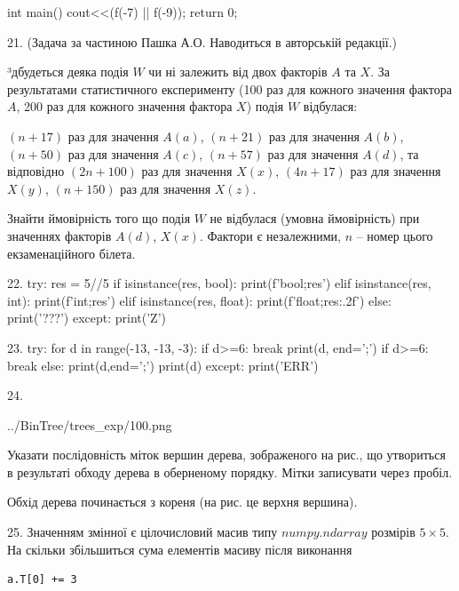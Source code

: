 \documentclass[11pt]{article}
\begin{document}
int main(){
    cout<<(f(-7) || f(-9));
    return 0;
}

21. 
(Задача за частиною Пашка А.О. Наводиться в авторській редакції.)\par {\hspace {0.5 cm}}³дбудеться деяка подія $W$ чи ні залежить від двох факторів $A$ та $X$. За результатами статистичного експерименту (100 раз для кожного значення фактора $A$,  200 раз для кожного значення фактора $X$) подія $W$ відбулася:\par {\hspace {0.5 cm}}$(n+17)$ раз для значення $A(a)$, $(n+21)$ раз для значення $A(b)$, $(n+50)$ раз для значення $A(c)$, $(n+57)$ раз для значення $A(d)$, та відповідно $(2n+100)$ раз для значення $X(x)$, $(4n+17)$ раз для значення $X(y)$, $(n+150)$ раз для значення $X(z)$.\par
{\hspace {0.5 cm}}Знайти ймовірність того що подія $W$ не відбулася (умовна ймовірність) при значеннях факторів $A(d)$, $X(x)$. Фактори є незалежними, $n$ – номер цього екзаменаційного білета.\par
22. 
try:
    res = 5//5%
    if isinstance(res, bool):
        print(f'bool;{res}')
    elif isinstance(res, int):
        print(f'int;{res}')
    elif isinstance(res, float):
        print(f'float;{res:.2f}')
    else:
        print('???')
except:
    print('Z')

23. 
try:
    for d in range(-13, -13, -3):
        if d>=6:
            break
        print(d, end=';')
        if d>=6:
            break
    else:
        print(d,end=';')
    print(d)
except:
    print('ERR')

24. 

\begin{center}
	{../BinTree/trees_exp/100.png}
\end{center}
Указати послідовність міток вершин дерева, зображеного на рис., що утвориться в результаті обходу дерева в оберненому порядку. Мітки записувати через пробіл.\par Обхід дерева починається з кореня (на рис. це верхня вершина).

25. 
Значенням змінної  є цілочисловий масив типу $numpy.ndarray$ розмірів $5{\times}5$. На скільки збільшиться сума елементів масиву  після виконання
\begin{verbatim}
a.T[0] += 3
\end{verbatim}
\end{document}
